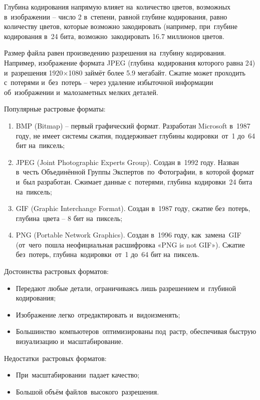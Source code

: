 \documentclass{ou}
\begin{document}
Глубина кодирования напрямую влияет на~количество цветов, возможных в~изображении -- число 2 в~степени, равной глубине кодирования, равно количеству цветов, которые возможно закодировать (например, при~глубине кодирования в~24 бита, возможно~закодировать 16.7 миллионов цветов.

Размер файла равен произведению разрешения на~глубину кодирования. Например, изображение формата JPEG (глубина~кодирования которого равна 24) и~разрешения 1920×1080 займёт более 5.9 мегабайт. Сжатие может проходить с~потерями и~без~потерь -- через удаление избыточной информации об~изображении и~малозаметных мелких деталей.

Популярные растровые форматы: 
\begin{enumerate}[itemindent=2em, nosep, label=\arabic*)]
\item BMP (Bitmap) -- первый графический формат. Разработан Microsoft в~1987 году, не имеет системы сжатия, поддерживает глубины кодировки~от~1 до~64 бит на~пиксель;
\item JPEG (Joint Photographic Experts Group). Создан в~1992 году. Назван в~честь Объединённой Группы Экспертов~по~Фотографии, в~которой формат и~был разработан. Сжимает данные с~потерями, глубина~кодировки~24 бита на~пиксель;
\item GIF (Graphic Interchange Format). Создан в~1987 году, сжатие без~потерь, глубина~цвета -- 8 бит на~пиксель;
\item PNG (Portable Network Graphics). Создан в~1996 году, как~замена~GIF (от~чего~пошла неофициальная расшифровка «PNG is not GIF»). Сжатие без~потерь, глубина~кодировки~от~1 до~64 бит на~пиксель.
\end{enumerate}

Достоинства растровых форматов:
\begin{itemize}[label=-, itemindent=2em, nosep]
\item Передают любые детали, ограничиваясь лишь разрешением и~глубиной кодирования;
\item Изображение легко~отредактировать и~видоизменять;
\item Большинство~компьютеров~оптимизированы под~растр, обеспечивая быструю визуализацию и~масштабирование.
\end{itemize}

Недостатки~растровых форматов:
\begin{itemize}[label=-, itemindent=2em, nosep]
\item При~масштабировании~падает качество;
\item Большой объём файлов~высокого~разрешения.
\end{itemize}
\end{document}
